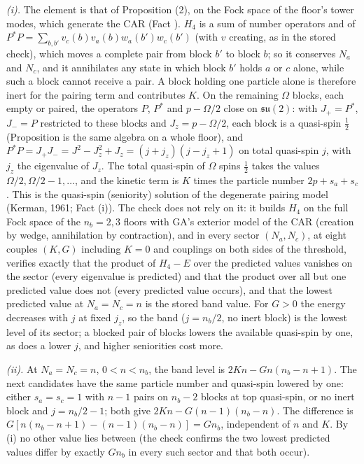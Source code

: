 \emph{(i).} The element is that of Proposition (2), on the Fock space of the floor's tower modes, which generate the CAR (Fact ). $H_{4}$ is a sum of number operators and of $P^{*}P = \sum_{b,b'}v_{c}(b)v_{a}(b)w_{a}(b')w_{c}(b')$ (with $v$ creating, as in the stored check), which moves a complete pair from block $b'$ to block $b$; so it conserves $N_{a}$ and $N_{c}$, and it annihilates any state in which block $b'$ holds $a$ or $c$ alone, while such a block cannot receive a pair. A block holding one particle alone is therefore inert for the pairing term and contributes $K$. On the remaining $\Omega$ blocks, each empty or paired, the operators $P$, $P^{*}$ and $p - \Omega/2$ close on $\mathfrak{su}(2)$: with $J_{+} = P^{*}$, $J_{-} = P$ restricted to these blocks and $J_{z} = p - \Omega/2$, each block is a quasi-spin $\tfrac12$ (Proposition  is the same algebra on a whole floor), and $P^{*}P = J_{+}J_{-} = J^{2} - J_{z}^{2} + J_{z} = (j + j_{z})(j - j_{z} + 1)$ on total quasi-spin $j$, with $j_{z}$ the eigenvalue of $J_{z}$. The total quasi-spin of $\Omega$ spins $\tfrac12$ takes the values $\Omega/2, \Omega/2 - 1, \dots$, and the kinetic term is $K$ times the particle number $2p + s_{a} + s_{c}$. This is the quasi-spin (seniority) solution of the degenerate pairing model (Kerman, 1961; Fact (i)). The check does not rely on it: it builds $H_{4}$ on the full Fock space of the $n_{b} = 2, 3$ floors with GA's exterior model of the CAR (creation by wedge, annihilation by contraction), and in every sector $(N_{a}, N_{c})$, at eight couples $(K, G)$ including $K = 0$ and couplings on both sides of the threshold, verifies exactly that the product of $H_{4} - E$ over the predicted values vanishes on the sector (every eigenvalue is predicted) and that the product over all but one predicted value does not (every predicted value occurs), and that the lowest predicted value at $N_{a} = N_{c} = n$ is the stored band value. For $G > 0$ the energy decreases with $j$ at fixed $j_{z}$, so the band ($j = n_{b}/2$, no inert block) is the lowest level of its sector; a blocked pair of blocks lowers the available quasi-spin by one, as does a lower $j$, and higher seniorities cost more.

\emph{(ii).} At $N_{a} = N_{c} = n$, $0 < n < n_{b}$, the band level is $2Kn - Gn(n_{b} - n + 1)$. The next candidates have the same particle number and quasi-spin lowered by one: either $s_{a} = s_{c} = 1$ with $n - 1$ pairs on $n_{b} - 2$ blocks at top quasi-spin, or no inert block and $j = n_{b}/2 - 1$; both give $2Kn - G(n - 1)(n_{b} - n)$. The difference is $G[n(n_{b} - n + 1) - (n - 1)(n_{b} - n)] = Gn_{b}$, independent of $n$ and $K$. By (i) no other value lies between (the check confirms the two lowest predicted values differ by exactly $Gn_{b}$ in every such sector and that both occur).

